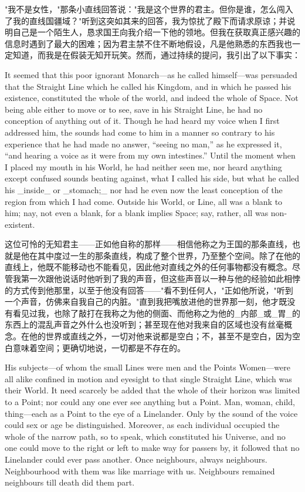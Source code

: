 \documentclass[12pt,UTF8]{ctexbook}
\begin{document}
"我不是女性，"那条小直线回答说："我是这个世界的君主。但你是谁，怎么闯入了我的直线国疆域？"听到这突如其来的回答，我为惊扰了殿下而请求原谅；并说明自己是一个陌生人，恳求国王向我介绍一下他的领地。但我在获取真正感兴趣的信息时遇到了最大的困难；因为君主禁不住不断地假设，凡是他熟悉的东西我也一定知道，而我是在假装无知开玩笑。然而，通过持续的提问，我引出了以下事实：

It seemed that this poor ignorant Monarch---as he called himself---was persuaded that the Straight Line which he called his Kingdom, and in which he passed his existence, constituted the whole of the world, and indeed the whole of Space. Not being able either to move or to see, save in his Straight Line, he had no conception of anything out of it. Though he had heard my voice when I first addressed him, the sounds had come to him in a manner so contrary to his experience that he had made no answer, ``seeing no man,'' as he expressed it, ``and hearing a voice as it were from my own intestines.'' Until the moment when I placed my mouth in his World, he had neither seen me, nor heard anything except confused sounds beating against, what I called his side, but what he called his \_inside\_ or \_stomach;\_ nor had he even now the least conception of the region from which I had come. Outside his World, or Line, all was a blank to him; nay, not even a blank, for a blank implies Space; say, rather, all was non-existent.

这位可怜的无知君主——正如他自称的那样——相信他称之为王国的那条直线，也就是他在其中度过一生的那条直线，构成了整个世界，乃至整个空间。除了在他的直线上，他既不能移动也不能看见，因此他对直线之外的任何事物都没有概念。尽管我第一次跟他说话时他听到了我的声音，但这些声音以一种与他的经验如此相悖的方式传到他那里，以至于他没有回答——"看不到任何人，"正如他所说，"听到一个声音，仿佛来自我自己的内脏。"直到我把嘴放进他的世界那一刻，他才既没有看见过我，也除了敲打在我称之为他的侧面、而他称之为他的\_内部\_或\_胃\_的东西上的混乱声音之外什么也没听到；甚至现在他对我来自的区域也没有丝毫概念。在他的世界或直线之外，一切对他来说都是空白；不，甚至不是空白，因为空白意味着空间；更确切地说，一切都是不存在的。

His subjects---of whom the small Lines were men and the Points Women---were all alike confined in motion and eyesight to that single Straight Line, which was their World. It need scarcely be added that the whole of their horizon was limited to a Point; nor could any one ever see anything but a Point. Man, woman, child, thing---each as a Point to the eye of a Linelander. Only by the sound of the voice could sex or age be distinguished. Moreover, as each individual occupied the whole of the narrow path, so to speak, which constituted his Universe, and no one could move to the right or left to make way for passers by, it followed that no Linelander could ever pass another. Once neighbours, always neighbours. Neighbourhood with them was like marriage with us. Neighbours remained neighbours till death did them part.
\end{document}

